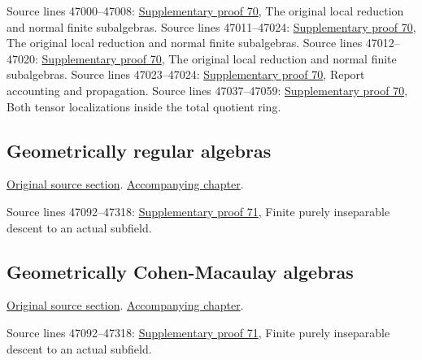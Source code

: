 \begin{AlgebraSourceRoutes}
 Source lines 47000--47008: \hyperlink{algebra_geonormal_notes_20260929}{Supplementary proof 70}, The original local reduction and normal finite subalgebras.
 Source lines 47011--47024: \hyperlink{algebra_geonormal_notes_20260929}{Supplementary proof 70}, The original local reduction and normal finite subalgebras.
 Source lines 47012--47020: \hyperlink{algebra_geonormal_notes_20260929}{Supplementary proof 70}, The original local reduction and normal finite subalgebras.
 Source lines 47023--47024: \hyperlink{algebra_geonormal_notes_20260929}{Supplementary proof 70}, Report accounting and propagation.
 Source lines 47037--47059: \hyperlink{algebra_geonormal_notes_20260929}{Supplementary proof 70}, Both tensor localizations inside the total quotient ring.
\end{AlgebraSourceRoutes}

\subsection{Geometrically regular algebras}
\hypertarget{algebra-source-section-geometrically-regular}{}
\noindent\href{https://github.com/stacks/stacks-project/blob/a04446e57ec1fbc252a871afcec7752fb2807b14/algebra.tex\#L47092}{Original source section}. \href{algebra.pdf\#nameddest=section-geometrically-regular}{Accompanying chapter}.

\begin{AlgebraSourceRoutes}
 Source lines 47092--47318: \hyperlink{algebra_georeg_cm_notes_20260929}{Supplementary proof 71}, Finite purely inseparable descent to an actual subfield.
\end{AlgebraSourceRoutes}

\subsection{Geometrically Cohen-Macaulay algebras}
\hypertarget{algebra-source-section-geometrically-CM}{}
\noindent\href{https://github.com/stacks/stacks-project/blob/a04446e57ec1fbc252a871afcec7752fb2807b14/algebra.tex\#L47255}{Original source section}. \href{algebra.pdf\#nameddest=section-geometrically-CM}{Accompanying chapter}.

\begin{AlgebraSourceRoutes}
 Source lines 47092--47318: \hyperlink{algebra_georeg_cm_notes_20260929}{Supplementary proof 71}, Finite purely inseparable descent to an actual subfield.
\end{AlgebraSourceRoutes}

